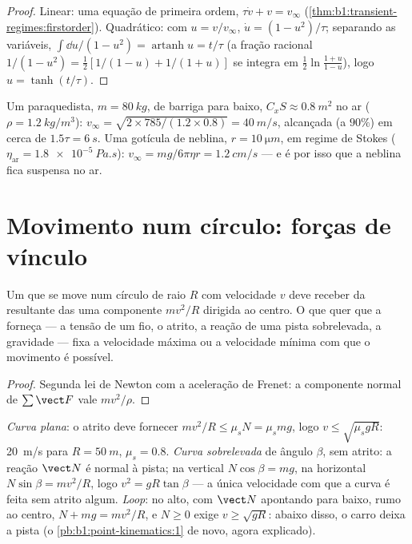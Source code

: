 \begin{proof}
Linear: uma equação de primeira ordem, $\tau\dot v + v = v_\infty$
(\cref{thm:b1:transient-regimes:firstorder}). Quadrático: com
$u = v/v_\infty$, $\dot u = (1 - u^2)/\tau$; separando as variáveis,
$\int\dd u/(1 - u^2) = \operatorname{artanh}u = t/\tau$ (a fração
racional $1/(1 - u^2) = \tfrac12[1/(1 - u) + 1/(1 + u)]$ se integra em
$\tfrac12\ln\frac{1 + u}{1 - u}$), logo $u = \tanh(t/\tau)$.
\end{proof}

\begin{example}\label{ex:b1:newton-dynamics:terminal}
Um paraquedista, $m = \qty{80}{kg}$, de barriga para baixo, $C_xS \approx \qty{0.8}{m^2}$
no ar ($\rho = \qty{1.2}{kg/m^3}$): $v_\infty = \sqrt{2 \times 785/(1.2
\times 0.8)} = \qty{40}{m/s}$, alcançada (a $90\%$) em cerca de $1.5\tau =
\qty{6}{s}$. Uma gotícula de neblina, $r = \qty{10}{\micro m}$, em regime de Stokes
($\eta_{\text{ar}} = \qty{1.8e-5}{Pa.s}$): $v_\infty = mg/6\pi\eta r =
\qty{1.2}{cm/s}$ --- e é por isso que a neblina fica suspensa no ar.
\end{example}

\section{Movimento num círculo: forças de vínculo}

\begin{proposition}\label{prop:b1:newton-dynamics:centripetal}
Um  que se move num círculo de raio $R$ com velocidade $v$ deve receber
da resultante das  uma componente $mv^2/R$ dirigida ao
centro. O que quer que a forneça --- a tensão de um fio, o atrito, a
reação de uma pista sobrelevada, a gravidade --- fixa a velocidade máxima ou a
velocidade mínima com que o movimento é possível.
\end{proposition}

\begin{proof}
Segunda lei de Newton com a aceleração de Frenet: a componente normal
de $\sum\vect F$ vale $mv^2/\rho$.
\end{proof}

\begin{example}\label{ex:b1:newton-dynamics:circles}
\emph{Curva plana}: o atrito deve fornecer $mv^2/R \leq \mu_sN = \mu_smg$,
logo $v \leq \sqrt{\mu_sgR}$: \qty{20}{m/s} para $R = \qty{50}{m}$,
$\mu_s = 0.8$. \emph{Curva sobrelevada} de ângulo $\beta$, sem atrito: a
reação $\vect N$ é normal à pista; na vertical $N\cos\beta = mg$,
na horizontal $N\sin\beta = mv^2/R$, logo $v^2 = gR\tan\beta$ --- a única
velocidade com que a curva é feita sem atrito algum. \emph{Loop}: no
alto, com $\vect N$ apontando para baixo, rumo ao centro, $N + mg =
mv^2/R$, e $N \geq 0$ exige $v \geq \sqrt{gR}$: abaixo disso, o carro
deixa a pista (o \cref{pb:b1:point-kinematics:1} de novo, agora explicado).
\end{example}

